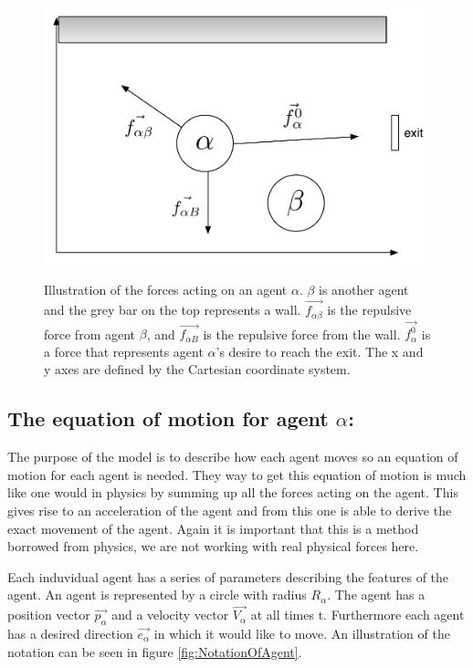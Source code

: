 \begin{figure}[ht]
    \centering
    {\includegraphics[scale=0.45]{Figures/ForceModel.pdf}} \caption[Notation 
    of forces acting on an agent]{Illustration of the forces acting on an 
    agent $\alpha $. $ \beta $ is another agent and the grey bar on the top 
    represents a wall. $ \vec{f_{\alpha\beta}} $ is the repulsive force from 
    agent $ \beta $, and $ \vec{f_{\alpha B}} $ is the repulsive force from 
    the wall. $ \vec{f^{0}_{\alpha}} $ is a force that represents agent $ 
    \alpha $'s desire to reach the exit.  The x and y axes are defined by the 
    Cartesian coordinate system.}
    \label{ForceModel}
\end{figure}

\subsection{The equation of motion for agent $ \alpha $:}
The purpose of the model is to describe how each agent moves so an equation of 
motion for each agent is needed. They way to get this equation of motion is 
much like one would in physics by summing up all the forces acting on the 
agent. This gives rise to an acceleration of the agent and from this one is 
able to derive the exact movement of the agent. Again it is important that 
this is a method borrowed from physics, we are not working with real physical 
forces here.

Each induvidual agent has a series of parameters describing the features of 
the agent. An agent is represented by a circle with radius $R_{\alpha}$. The 
agent has a position vector $\vec{p_{\alpha}}$ and a velocity vector $\vec{V_{\alpha}}$ at 
all times t. Furthermore each agent has a desired direction $\vec{e_{\alpha}}$ 
in which it would like to move. An illustration of the notation can be seen in 
figure \ref{fig:NotationOfAgent}.

